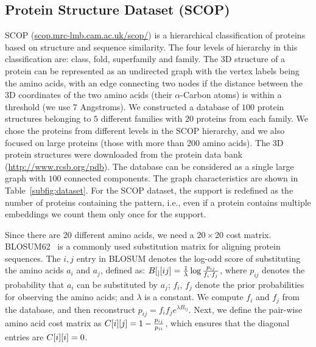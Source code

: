 


\subsection{Protein Structure Dataset (SCOP)}
SCOP (\url{scop.mrc-lmb.cam.ac.uk/scop/}) 
is a hierarchical classification of proteins based on structure
and sequence similarity. The four levels of hierarchy in this
classification are: class, fold, superfamily and family.  The 3D
structure of a protein can be represented as an undirected graph with
the vertex labels being the amino acids, with an edge connecting two
nodes if the distance between the 
3D coordinates of the two amino acids (their
$\alpha$-Carbon atoms) is within a threshold (we use 7 Angstroms).
We constructed a database of
$100$ protein structures belonging to $5$ different families with $20$
proteins from each family. 
We chose the proteins from different levels in the SCOP hierarchy, and
we also focused on large proteins (those with more than 200 amino
acids). 
The 3D protein structures were downloaded from the
protein data bank (\url{http://www.rcsb.org/pdb}).  The database
can be considered as a single large graph with $100$ connected
components. The graph characteristics are shown in
Table~\ref{subfig:dataset}. 
For the SCOP dataset, the support is redefined as 
the number of proteins containing the pattern, i.e., 
even if a protein contains multiple embeddings we count them only once for the support.

\smallskip{}
Since there are 20 different amino acids, we need a $20 \times 20$ cost
matrix. BLOSUM62~\cite{HH92} is a commonly used substitution matrix for aligning protein
sequences.  The $i,j$ entry in BLOSUM denotes the log-odd score
of substituting the amino acids $a_i$ and $a_j$, defined as:
    ${B}[_][ij] = \frac{1}{\lambda} 
	\log\frac{p_{ij}}{f_i \cdot f_j}$,
where $p_{ij}$ denotes the probability that  $a_i$ can be
substituted by $a_j$; 
$f_i$, $f_j$ denote the prior probabilities for observing the 
amino acids; and $\lambda$ is a constant. We compute $f_i$ and $f_j$
from the database, and then reconstruct $p_{ij}=f_if_j e^{\lambda
B_{ij}}$. Next, we define the pair-wise amino acid cost matrix as
${C}[i][j] = 1-\frac{p_{ij}}{p_{ii}}$, which ensures that
the diagonal entries are ${C}[i][i] =0$.

